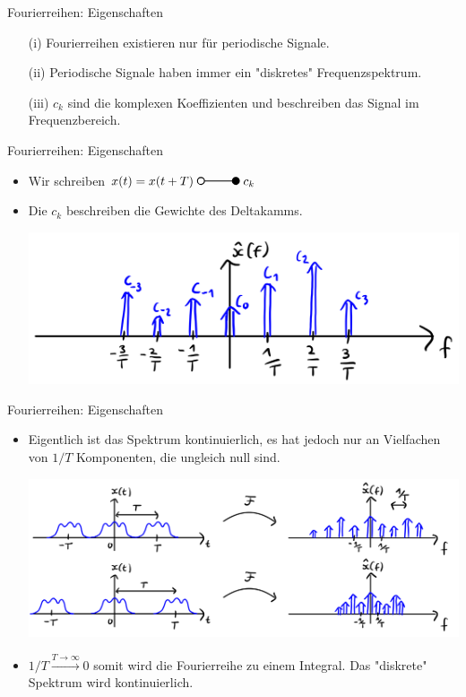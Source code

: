 \documentclass[14pt, aspectratio=169, handout]{beamer}
\newcommand{\transform}[2]{%
    \begin{tikzpicture}
        \draw[thick] (0,0) circle (0.1);
        \draw[thick] (0.1,0) -- (#2,0) node[midway, above] {#1};
        \filldraw[thick] (#2,0) circle (0.1);
    \end{tikzpicture}%
}
\begin{document}
\begin{frame}{Fourierreihen: Eigenschaften}
    \begin{itemize}
        \item[(i)] Fourierreihen existieren nur für periodische Signale.
        \item[] 
        \item[(ii)] Periodische Signale haben immer ein "diskretes" Frequenzspektrum.
        \item[] 
        \item[(iii)] $c_k$ sind die komplexen Koeffizienten und beschreiben das Signal im Frequenzbereich.
    \end{itemize}
\end{frame}

\begin{frame}{Fourierreihen: Eigenschaften}
    \begin{itemize}
        \item Wir schreiben $x(t) = x(t+T) \; \transform{}{1} \; c_k$
        \item[] 
        \item Die $c_k$ beschreiben die Gewichte des Deltakamms.
        \item[]
        \item[] \begin{center}
            \includegraphics[width=0.7\linewidth]{figures/delta_gewichtet.jpg}
        \end{center}
    \end{itemize}
\end{frame}

\begin{frame}{Fourierreihen: Eigenschaften}
    \begin{itemize}
         \item Eigentlich ist das Spektrum kontinuierlich, es hat jedoch nur an Vielfachen von $1/T$ Komponenten, die ungleich null sind.
        \item[] \begin{center}
            \includegraphics[width=0.8\linewidth]{figures/T_increase.jpg}
        \end{center}
        \item $1/T \xrightarrow{T \to \infty} 0$ somit wird die Fourierreihe zu einem Integral. Das "diskrete" Spektrum wird kontinuierlich.
    \end{itemize}
\end{frame}
\end{document}
